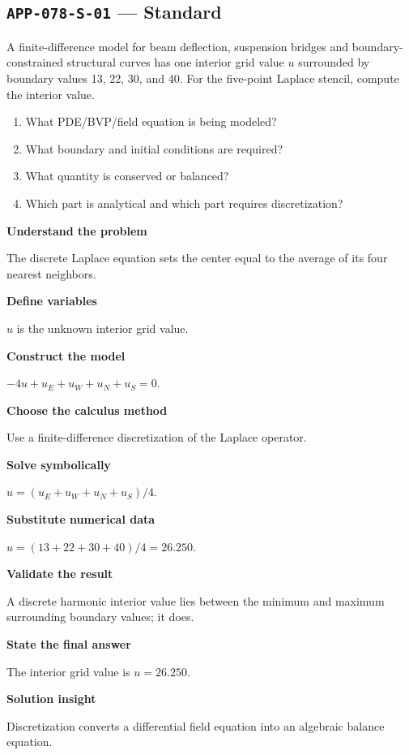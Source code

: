 \documentclass[11pt]{book}
\newcommand{\pid}[1]{\texttt{#1}}
\begin{document}
\subsection*{\pid{APP-078-S-01} — Standard}
\begin{problembox}
A finite-difference model for beam deflection, suspension bridges and boundary-constrained structural curves has one interior grid value $u$ surrounded by boundary values 13, 22, 30, and 40. For the five-point Laplace stencil, compute the interior value.
\end{problembox}
\begin{promptbox}\begin{enumerate}
\item What PDE/BVP/field equation is being modeled?
\item What boundary and initial conditions are required?
\item What quantity is conserved or balanced?
\item Which part is analytical and which part requires discretization?
\end{enumerate}\end{promptbox}
\begin{solutionbox}
\textbf{Understand the problem}\par The discrete Laplace equation sets the center equal to the average of its four nearest neighbors.\par\medskip
\textbf{Define variables}\par $u$ is the unknown interior grid value.\par\medskip
\textbf{Construct the model}\par $-4u+u_E+u_W+u_N+u_S=0$.\par\medskip
\textbf{Choose the calculus method}\par Use a finite-difference discretization of the Laplace operator.\par\medskip
\textbf{Solve symbolically}\par $u=(u_E+u_W+u_N+u_S)/4$.\par\medskip
\textbf{Substitute numerical data}\par $u=(13+22+30+40)/4=26.250$.\par\medskip
\textbf{Validate the result}\par A discrete harmonic interior value lies between the minimum and maximum surrounding boundary values; it does.\par\medskip
\textbf{State the final answer}\par The interior grid value is $u=26.250$.\par\medskip
\textbf{Solution insight}\par Discretization converts a differential field equation into an algebraic balance equation.\par\medskip
\end{solutionbox}
\end{document}
